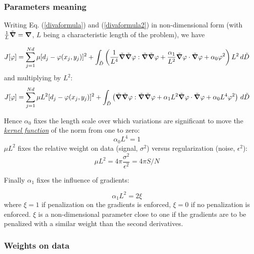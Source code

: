 \subsubsection{Parameters meaning\label{sec:parammeaning}}

Writing Eq. (\ref{divaformula}) and (\ref{divaformula2}) in non-dimensional form (with $\frac{1}{L}\tilde{\boldsymbol{\nabla}}=\boldsymbol{\nabla}$, $L$ being a characteristic length of the problem), we have

\begin{equation}
J[\varphi]=\sum_{j=1}^{Nd}\mu[d_{j}-\varphi(x_{j},y_{j})]^{2}+
 \int_{\tilde{D}}\left(
\frac{1}{L^4} \tilde{\boldsymbol{\nabla}}\tilde{\boldsymbol{\nabla}}\varphi : \tilde{\boldsymbol{\nabla}}\tilde{\boldsymbol{\nabla}}\varphi + \frac{\alpha_{1}}{L^2}
\tilde{\boldsymbol{\nabla}}\varphi \cdot \tilde{\boldsymbol{\nabla}}\varphi + \alpha_{0} \varphi^{2} \right) L^2\,d\tilde{D}
\end{equation}
and multiplying by $L^{2}$:
\begin{equation}
{J}[\varphi]=\sum_{j=1}^{Nd}\mu L^2 [d_{j}-\varphi(x_{j},y_{j})]^{2}+
 \int_{\tilde{D}}\left(
 \tilde{\boldsymbol{\nabla}}\tilde{\boldsymbol{\nabla}}\varphi : \tilde{\boldsymbol{\nabla}}\tilde{\boldsymbol{\nabla}}\varphi + { \alpha_{1} L^2}
\tilde{\boldsymbol{\nabla}}\varphi \cdot \tilde{\boldsymbol{\nabla}}\varphi + \alpha_{0} L^4 \varphi^{2} \right) \,d\tilde{D}
\label{divaformulaadim}
\end{equation}


Hence $\alpha_0$ fixes the length scale over which variations are significant to move the \hyperlink{KERNEL}{\textit{kernel function}} of the norm from one to zero:
\begin{equation}
\alpha_0 L^4 = 1
\end{equation}
$ \mu L^2$ fixes the relative weight on data (signal, $\sigma^2$) versus regularization (noise, $\epsilon^2$):
\begin{equation}
\mu L^2= 4 \pi \frac{\sigma^2}{\epsilon^2}= 4 \pi S/N 
\label{defmu}
\end{equation}

Finally  $\alpha_1$ fixes the influence of gradients:

\begin{equation}
\alpha_1 L^2 = 2 \xi
\end{equation}
where   $\xi=1$ if penalization on the gradients is enforced, $\xi=0$ if no penalization is enforced. $\xi$ is a non-dimensional parameter close to one if the gradients are to be penalized with a similar weight than the second derivatives.


\subsubsection{Weights on data}

